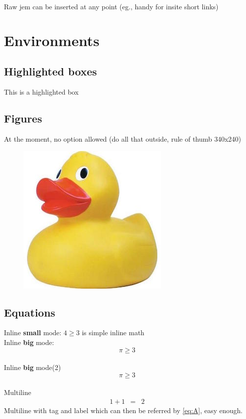 Raw jem can be inserted at any point (eg., handy for insite short links)
\section{Environments}
\subsection{Highlighted boxes}
\begin{ybox} This is a highlighted box \end{ybox}

\subsection{Figures}
At the moment, no option allowed (do all that outside, rule of thumb 340x240)
\begin{figure}[!h]\center\includegraphics{_figs/rubber-duck.jpg}\end{figure}

\subsection{Equations}
Inline \textbf{small} mode: $4 \ge 3$ is simple inline math\\
Inline \textbf{big} mode:   $$\pi\ge3$$\\
Inline \textbf{big} mode(2) $$\pi\ge3$$\\
Multiline
\begin{eqnarray} 1+1&=&2\end{eqnarray}
Multiline with tag and label
which can then be referred by \eqref{eq:A}, easy enough.\\

